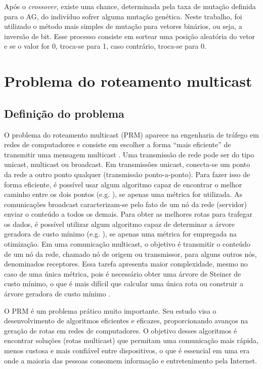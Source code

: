 Após o \textit{crossover}, existe uma chance, determinada pela taxa de mutação definida para o AG, do indivíduo sofrer alguma mutação genética. Neste trabalho, foi utilizado o método mais simples de mutação para vetores binários, ou seja, a inversão de bit. Esse processo consiste em sortear uma posição aleatória do vetor e se o valor for 0, troca-se para 1, caso contrário, troca-se para 0.

\section{Problema do roteamento multicast}
\label{section_problemas_prm}

\subsection{Definição do problema}

O problema do roteamento multicast (PRM) aparece na engenharia de tráfego em redes de computadores e consiste em escolher a forma ``mais eficiente'' de transmitir uma mensagem multicast \cite{Lafeta2016}. Uma transmissão de rede pode ser do tipo unicast, multicast ou broadcast. Em transmissões unicast, conecta-se um ponto da rede a outro ponto qualquer (transmissão ponto-a-ponto). Para fazer isso de forma eficiente, é possível usar algum algoritmo capaz de encontrar o melhor caminho entre os dois pontos (e.g. \cite{Dijkstra1959}), se apenas uma métrica for utilizada. As comunicações broadcast caracterizam-se pelo fato de um nó da rede (servidor) enviar o conteúdo a todos os demais. Para obter as melhores rotas para trafegar os dados, é possível utilizar algum algoritmo capaz de determinar a árvore geradora de custo mínimo (e.g. \cite{Prim1957}), se apenas uma métrica for empregada na otimização. Em uma comunicação multicast, o objetivo é transmitir o conteúdo de um nó da rede, chamado nó de origem ou transmissor, para alguns outros nós, denominados receptores. Essa tarefa apresenta maior complexidade, mesmo no caso de uma única métrica, pois é necessário obter uma árvore de Steiner de custo mínimo, o que é mais difícil que calcular uma única rota ou construir a árvore geradora de custo mínimo \cite{Bueno2010}.

O PRM é um problema prático muito importante. Seu estudo visa o desenvolvimento de algoritmos eficientes e eficazes, proporcionando avanços na geração de rotas em redes de computadores. O objetivo desses algoritmos é encontrar soluções (rotas multicast) que permitam uma comunicação mais rápida, menos custosa e mais confiável entre dispositivos, o que é essencial em uma era onde a maioria das pessoas consomem informação e entretenimento pela Internet.

